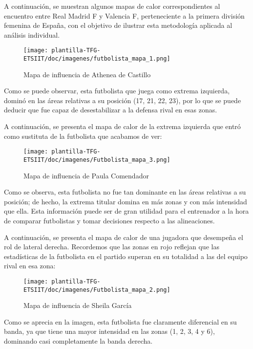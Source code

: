 A continuación, se muestran algunos mapas de calor correspondientes al encuentro entre Real Madrid F y Valencia F, perteneciente a la primera división femenina de España, con el objetivo de ilustrar esta metodología aplicada al análisis individual.

\begin{figure}[H]
    \centering
    \texttt{[image: plantilla-TFG-ETSIIT/doc/imagenes/futbolista\_mapa\_1.png]}
    \caption{Mapa de influencia de Athenea de Castillo}
    \label{fig:etiqueta-imagen}
\end{figure}

Como se puede observar, esta futbolista que juega como extrema izquierda, dominó en las áreas relativas a su posición (17, 21, 22, 23), por lo que se puede deducir que fue capaz de desestabilizar a la defensa rival en esas zonas.

A continuación, se presenta el mapa de calor de la extrema izquierda que entró como sustituta de la futbolista que acabamos de ver:

\begin{figure}[H]
    \centering
    \texttt{[image: plantilla-TFG-ETSIIT/doc/imagenes/Futbolista\_mapa\_3.png]}
    \caption{Mapa de influencia de Paula Comendador}
    \label{fig:etiqueta-imagen}
\end{figure}

Como se observa, esta futbolista no fue tan dominante en las áreas relativas a su posición; de hecho, la extrema titular domina en más zonas y con más intensidad que ella. Esta información puede ser de gran utilidad para el entrenador a la hora de comparar futbolistas y tomar decisiones respecto a las alineaciones.

A continuación, se presenta el mapa de calor de una jugadora que desempeña el rol de lateral derecha. Recordemos que las zonas en rojo reflejan que las estadísticas de la futbolista en el partido superan en su totalidad a las del equipo rival en esa zona:

\begin{figure}[H]
    \centering
    \texttt{[image: plantilla-TFG-ETSIIT/doc/imagenes/Futbolista\_mapa\_2.png]}
    \caption{Mapa de influencia de Sheila García}
    \label{fig:etiqueta-imagen}
\end{figure}

Como se aprecia en la imagen, esta futbolista fue claramente diferencial en su banda, ya que tiene una mayor intensidad en las zonas (1, 2, 3, 4 y 6), dominando casi completamente la banda derecha.

